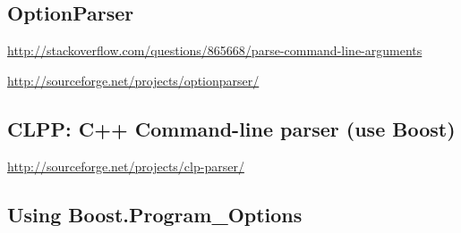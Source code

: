 \subsection{OptionParser}

\url{http://stackoverflow.com/questions/865668/parse-command-line-arguments}

\url{http://sourceforge.net/projects/optionparser/}

\subsection{CLPP: C++ Command-line parser (use Boost)}

\url{http://sourceforge.net/projects/clp-parser/}

\subsection{Using Boost.Program\_Options}

